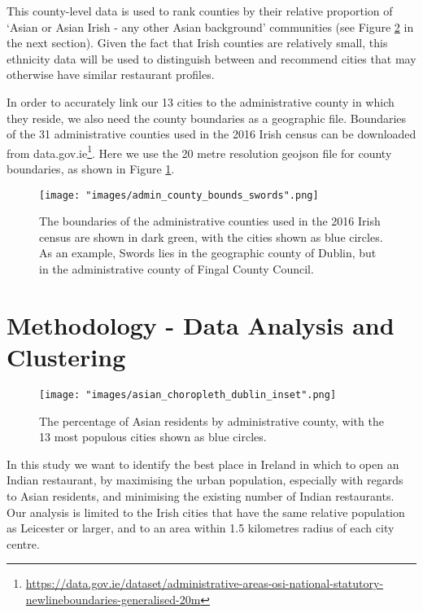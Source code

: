 \documentclass[a4paper,11pt]{article}
\begin{document}
This county-level data is used to rank counties by their relative proportion of `Asian or Asian Irish - any other Asian background' communities (see Figure \ref{fig: ethnicity choropleth} in the next section). Given the fact that Irish counties are relatively small, this ethnicity data will be used to distinguish between and recommend cities that may otherwise have similar restaurant profiles. 

In order to accurately link our 13 cities to the administrative county in which they reside, we also need the county boundaries as a geographic file. Boundaries of the 31 administrative counties used in the 2016 Irish census can be downloaded from data.gov.ie\footnote{\url{https://data.gov.ie/dataset/administrative-areas-osi-national-statutory-newlineboundaries-generalised-20m}}. Here we use the 20 metre resolution geojson file for county boundaries, as shown in Figure \ref{fig:admin counties}.
%
\begin{figure}[htb]
   \centering
   \texttt{[image: "images/admin\_county\_bounds\_swords".png]}
      \caption{The boundaries of the administrative counties used in the 2016 Irish census are shown in dark green, with the cities shown as blue circles. As an example, Swords lies in the geographic county of Dublin, but in the administrative county of Fingal County Council.}
      \label{fig:admin counties}
\end{figure}
%   

\section{Methodology - Data Analysis and Clustering}
%
\begin{figure}[htb]
   \centering
   \texttt{[image: "images/asian\_choropleth\_dublin\_inset".png]}
      \caption{The percentage of Asian residents by administrative county, with the 13 most populous cities shown as blue circles.}
      \label{fig: ethnicity choropleth}
\end{figure}
%
In this study we want to identify the best place in Ireland in which to open an Indian restaurant, by maximising the urban population, especially with regards to Asian residents, and minimising the existing number of Indian restaurants. Our analysis is limited to the Irish cities that have the same relative population as Leicester or larger, and to an area within 1.5 kilometres radius of each city centre.
\end{document}
